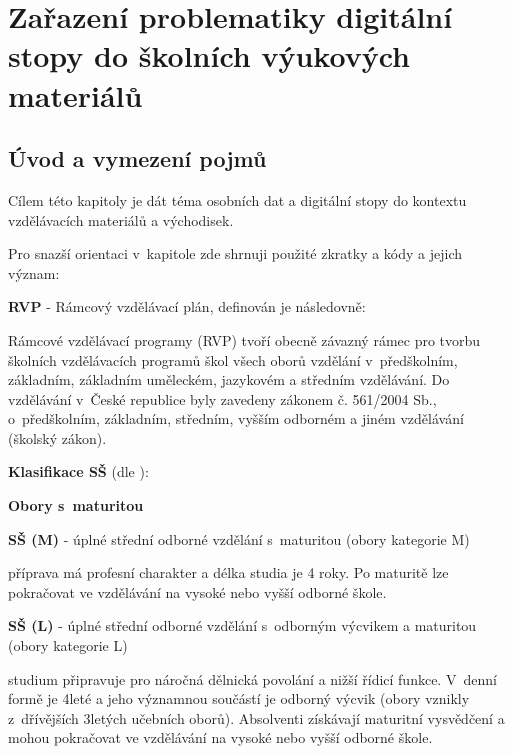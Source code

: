 \chapter{Zařazení problematiky digitální stopy do školních výukových materiálů}

\section{Úvod a vymezení pojmů}

Cílem této kapitoly je dát téma osobních dat a digitální stopy do kontextu vzdělávacích materiálů a východisek.

Pro snazší orientaci v~kapitole zde shrnuji použité zkratky a kódy a jejich význam:

\textbf{RVP} - Rámcový vzdělávací plán, definován \citep{rvp} je následovně:

\begin{displayquote}
Rámcové vzdělávací programy (RVP) tvoří obecně závazný rámec pro tvorbu školních vzdělávacích programů škol všech oborů vzdělání v~předškolním, základním, základním uměleckém, jazykovém a středním vzdělávání. Do vzdělávání v~České republice byly zavedeny zákonem č. 561/2004 Sb., o~předškolním, základním, středním, vyšším odborném a jiném vzdělávání (školský zákon).
\end{displayquote}

\textbf{Klasifikace SŠ} (dle \citep{stredni-vzdelavani}):

\textbf{Obory s~maturitou}

\textbf{SŠ (M)} - úplné střední odborné vzdělání s~maturitou (obory kategorie M)

\begin{displayquote}
příprava má profesní charakter a délka studia je 4 roky. Po maturitě lze pokračovat ve vzdělávání na vysoké nebo vyšší odborné škole.
\end{displayquote}

\textbf{SŠ (L)} - úplné střední odborné vzdělání s~odborným výcvikem a maturitou (obory kategorie L)

\begin{displayquote}
studium připravuje pro náročná dělnická povolání a nižší řídicí funkce. V~denní formě je 4leté a jeho významnou součástí je odborný výcvik (obory vznikly z~dřívějších 3letých učebních oborů). Absolventi získávají maturitní vysvědčení a mohou pokračovat ve vzdělávání na vysoké nebo vyšší odborné škole.
\end{displayquote}

